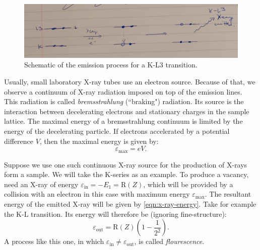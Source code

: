 \documentclass[11pt,a4paper,twoside,onecolumn]{article}
\newcommand{\rydberg}{\mathrm{R}}
\begin{document}
\begin{figure}[!htbp]
    \centering
    \includegraphics[width=\textwidth]{img/emission-diagram.png}
    \caption{Schematic of the emission process for a K-L3 transition.}\label{fig:emission-diagram}
\end{figure}

Usually, small laboratory X-ray tubes use an electron source. Because of that, we observe a continuum of X-ray radiation imposed on top of the emission lines. This radiation is called \emph{bremsstrahlung} (``braking") radiation. Its source is the interaction between decelerating electrons and stationary charges in the sample lattice. The maximal energy of a bremsstrahlung continuum is limited by the energy of the decelerating particle. If electrons accelerated by a potential difference $V$, then the maximal energy is given by: 
\begin{equation}\label{eqn:bremss-energy-max}
    \varepsilon_\mathrm{max} = eV.
\end{equation}

Suppose we use one such continuous X-ray source for the production of X-rays form a sample. We will take the K-series as an example. To produce a vacancy, need an X-ray of energy $\varepsilon_\mathrm{in} = - E_1 = \rydberg(Z)$, which will be provided by a collision with an electron in this case with maximum energy $\varepsilon_\mathrm{max}$. The resultant energy of the emitted X-ray will be given by \eqref{eqn:x-ray-energy}. Take for example the K-L transition. Its energy will therefore be (ignoring fine-structure):
\begin{equation}\label{eqn:Kalpha-energy-out}
    \varepsilon_\mathrm{out} = \rydberg\left(Z\right) \left(1 - \frac{1}{2^2}\right).
\end{equation}
A process like this one, in which $\varepsilon_\mathrm{in} \neq \varepsilon_\mathrm{out}$, is called \emph{flourescence}.
\end{document}
